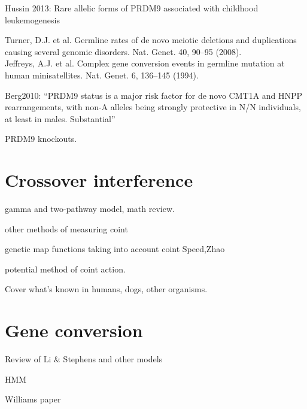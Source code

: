 Hussin 2013: Rare allelic forms of PRDM9 associated with childhood leukemogenesis

Turner, D.J. et al. Germline rates of de novo meiotic deletions and duplications causing several genomic disorders. Nat. Genet. 40, 90–95 (2008). \\
Jeffreys, A.J. et al. Complex gene conversion events in germline mutation at human minisatellites. Nat. Genet. 6, 136–145 (1994).

Berg2010:
``PRDM9 status is a major risk factor for de novo CMT1A and HNPP rearrangements, with non-A alleles being strongly protective in N/N individuals, at least in males. Substantial''

PRDM9 knockouts.

\section{Crossover interference}

\begin{titemize}
    \item gamma and two-pathway model, math review.
    \item other methods of measuring coint
    \item genetic map functions taking into account coint Speed,Zhao
    \item potential method of coint action.
    \item Cover what's known in humans, dogs, other organisms.
\end{titemize}

\section{Gene conversion}

\begin{titemize}
    \item Review of Li \& Stephens and other models
    \item HMM
    \item Williams paper
\end{titemize}

